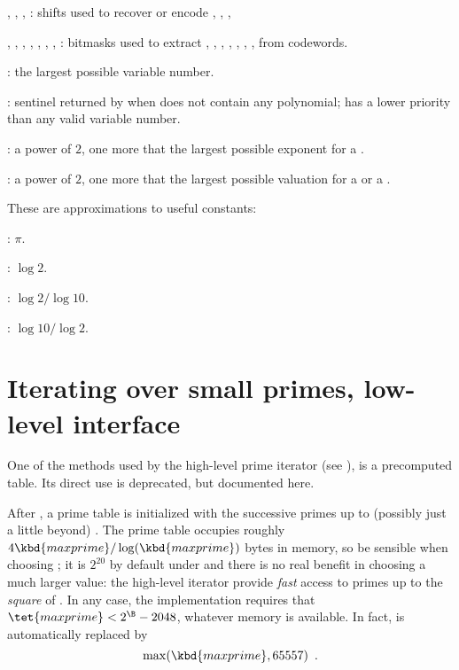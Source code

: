 \noindent {},
,
,
: shifts used to recover or encode , ,
, 

\noindent {},
,
,
,
,
,
,
: bitmasks used to extract , , ,
, , , ,  from 
codewords.

\noindent {}: the largest possible variable number.

\noindent {}:  sentinel returned by  when 
does not contain any polynomial; has a lower priority than any valid variable
number.

\noindent {}: a power of $2$, one more that the largest possible
exponent for a .

\noindent {}: a power of $2$, one more that the largest possible
valuation for a  or a .


These are  approximations to useful constants:

\noindent {}: $\pi$.

\noindent {}: $\log 2$.

\noindent {}: $\log 2 / \log 10$.

\noindent {}: $\log 10 / \log 2$.

\section{Iterating over small primes, low-level interface}
\label{se:primetable}

One of the methods used by the high-level prime iterator (see
), is a precomputed table. Its direct use is deprecated,
but documented here.

After , a prime table  is
initialized with the successive primes up to (possibly
just a little beyond) . The prime table occupies roughly
$4 \kbd{maxprime}/\log(\kbd{maxprime})$ bytes in memory, so be sensible when
choosing ; it is $2^{20}$ by default under  and there
is no real benefit in choosing a much larger value: the high-level
iterator provide \emph{fast} access to primes up to the \emph{square}
of . In any case, the implementation requires that
$\tet{maxprime} < 2^{\B} - 2048$, whatever memory is available.
In fact,  is automatically replaced by
$$\max(\kbd{maxprime}, 65557)\enspace.$$

